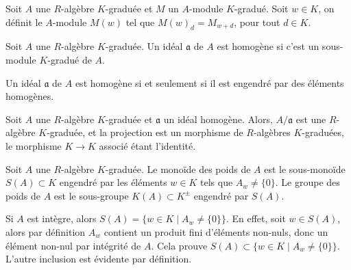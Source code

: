 \begin{ex}\label{GradedTwistedModule}
Soit $A$ une $R$-algèbre $K$-graduée et $M$ un $A$-module $K$-gradué. Soit $w\in K$, on définit le $A$-module $M(w)$ tel que $M(w)_d=M_{w+d}$, pour tout $d\in K$.
\end{ex}

\begin{defn}
Soit $A$ une $R$-algèbre $K$-graduée. Un idéal $\mathfrak{a}$ de $A$ est homogène si c'est un sous-module $K$-gradué de $A$.
\end{defn}

\begin{prop}
Un idéal $\mathfrak{a}$ de $A$ est homogène si et seulement si il est engendré par des éléments homogènes.
\end{prop}

\begin{rem}
Soit $A$ une $R$-algèbre $K$-graduée et $\mathfrak{a}$ un idéal homogène. Alors, $A/\mathfrak{a}$ est une $R$-algèbre $K$-graduée, et la projection est un morphisme de $R$-algèbres $K$-graduées, le morphisme $K\rightarrow K$ associé étant l'identité.
\end{rem}

\begin{defn}
Soit $A$ une $R$-algèbre $K$-graduée. Le monoïde des poids de $A$ est le sous-monoïde $S(A)\subset K$ engendré par les éléments $w\in K$ tels que $A_w\neq \lbrace 0 \rbrace$. Le groupe des poids de $A$ est le sous-groupe $K(A)\subset K^{\pm}$ engendré par $S(A)$.
\end{defn}

\begin{rem}
Si $A$ est intègre, alors $S(A)=\lbrace w\in K\mid A_w\neq \lbrace 0\rbrace\rbrace$. En effet, soit $w\in S(A)$, alors par définition $A_w$ contient un produit fini d'éléments non-nuls, donc un élément non-nul par intégrité de $A$. Cela prouve $S(A)\subset\lbrace w\in K\mid A_w\neq \lbrace 0\rbrace\rbrace$. L'autre inclusion est évidente par définition.
\end{rem}

